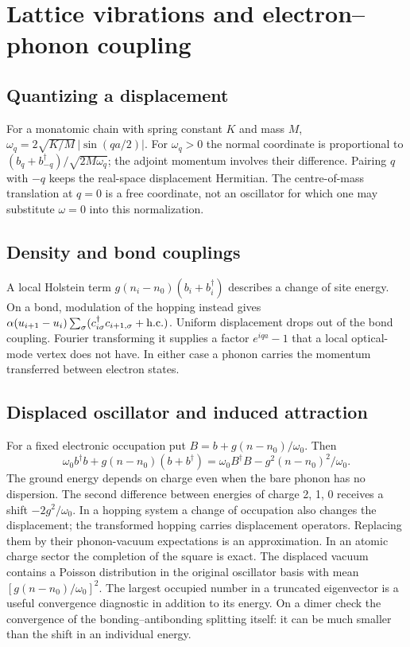 \chapter{Lattice vibrations and electron--phonon coupling}
\section{Quantizing a displacement}
For a monatomic chain with spring constant $K$ and mass $M$,
$\omega_q=2\sqrt{K/M}\,|\sin(qa/2)|$. For $\omega_q>0$ the normal
coordinate is proportional to $(b_q+b^\dagger_{-q})/\sqrt{2M\omega_q}$;
the adjoint momentum involves their difference. Pairing $q$ with $-q$
keeps the real-space displacement Hermitian. The centre-of-mass
translation at $q=0$ is a free coordinate, not an oscillator for which
one may substitute $\omega=0$ into this normalization.

\section{Density and bond couplings}
A local Holstein term $g(n_i-n_0)(b_i+b_i^\dagger)$ describes a change
of site energy. On a bond, modulation of the hopping instead gives
$\alpha(u_{i+1}-u_i)\sum_\sigma(c^\dagger_{i\sigma}c_{i+1,\sigma}+\mathrm{h.c.})$.
Uniform displacement drops out of the bond coupling. Fourier transforming
it supplies a factor $e^{iqa}-1$ that a local optical-mode vertex does
not have. In either case a phonon carries the momentum transferred
between electron states.

\section{Displaced oscillator and induced attraction}
For a fixed electronic occupation put $B=b+g(n-n_0)/\omega_0$. Then
\[
 \omega_0 b^\dagger b+g(n-n_0)(b+b^\dagger)
 =\omega_0 B^\dagger B-g^2(n-n_0)^2/\omega_0 .
\]
The ground energy depends on charge even when the bare phonon has no
dispersion. The second difference between energies of charge 2, 1, 0
receives a shift $-2g^2/\omega_0$. In a hopping system a change of
occupation also changes the displacement; the transformed hopping
carries displacement operators. Replacing them by their phonon-vacuum
expectations is an approximation. In an atomic charge sector the
completion of the square is exact.
The displaced vacuum contains a Poisson distribution in the original
oscillator basis with mean $[g(n-n_0)/\omega_0]^2$. The largest
occupied number in a truncated eigenvector is a useful convergence
diagnostic in addition to its energy. On a dimer check the convergence
of the bonding--antibonding splitting itself: it can be much smaller
than the shift in an individual energy.


